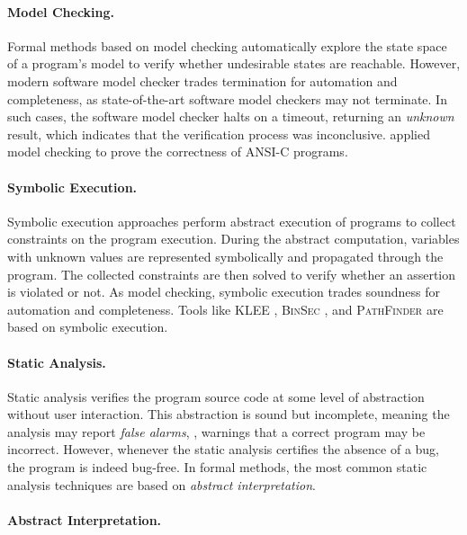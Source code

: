 \paragraph{Model Checking.}

Formal methods based on model checking  automatically explore the state space of a program's model to verify whether undesirable states are reachable.
However, modern software model checker trades termination for automation and completeness, as state-of-the-art software model checkers may not terminate.
In such cases, the software model checker halts on a timeout, returning an \emph{unknown} result, which indicates that the verification process was inconclusive.
 applied model checking to prove the correctness of ANSI-C programs.

\paragraph{Symbolic Execution.}

Symbolic execution  approaches perform abstract execution of programs to collect constraints on the program execution. During the abstract computation, variables with unknown values are represented symbolically and propagated through the program.
The collected constraints are then solved to verify whether an assertion is violated or not. As model checking, symbolic execution trades soundness for automation and completeness.
Tools like \textsc{KLEE} , \textsc{BinSec} , and \textsc{PathFinder}  are based on symbolic execution.

\paragraph{Static Analysis.}

Static analysis verifies the program source code at some level of abstraction without user interaction.
This abstraction is sound but incomplete, meaning the analysis may report \emph{false alarms}, \ie, warnings that a correct program may be incorrect.
However, whenever the static analysis certifies the absence of a bug, the program is indeed bug-free.
In formal methods, the most common static analysis techniques are based on \emph{abstract interpretation}.

\paragraph{Abstract Interpretation.}


